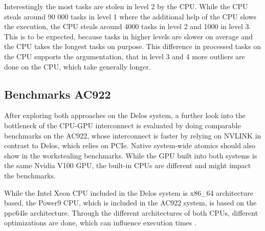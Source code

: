 Interestingly the most tasks are stolen in level 2 by the CPU. While the CPU steals around 90 000 tasks in level 1 where the additional help of the CPU slows the execution, the CPU steals around 4000 tasks in level 2 and 1000 in level 3. This is to be expected, because tasks in higher levels are slower on average and the CPU takes the longest tasks on purpose. This difference in processed tasks on the CPU supports the argumentation, that in level 3 and 4 more outliers are done on the CPU, which take generally longer.

\subsection{Benchmarks AC922}
After exploring both approaches on the Delos system, a further look into the bottleneck of the CPU-GPU interconnect is evaluated by doing comparable benchmarks on the AC922, whose interconnect is faster by relying on NVLINK in contrast to Delos, which relies on PCIe. Native system-wide atomics should also show in the workstealing benchmarks.
While the GPU built into both systems is the same Nvidia V100 GPU, the built-in CPUs are different and might impact the benchmarks.

While the Intel Xeon CPU included in the Delos system is x86\_64 architecture based, the Power9 CPU, which is included in the AC922 system, is based on the ppc64le architecture. Through the different architectures of both CPUs, different optimizations are done, which can influence execution times \cite{AnalysisX86Vs}.





